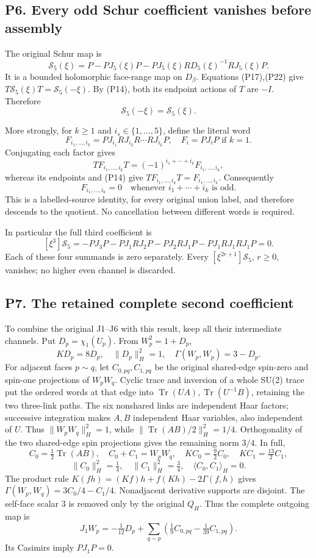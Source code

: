 \documentclass[11pt]{article}
\begin{document}
\subsection*{P6. Every odd Schur coefficient vanishes before assembly}

The original Schur map is
\[
 \mathscr S_5(\xi)=P-PJ_5(\xi)P
 -PJ_5(\xi)R D_5(\xi)^{-1}RJ_5(\xi)P. \tag{P23}
\]
It is a bounded holomorphic face-range map on \(D_\beta\). Equations (P17),(P22) give \(T\mathscr S_5(\xi)T=\mathscr S_5(-\xi)\). By (P14), both its endpoint actions of \(T\) are \(-I\). Therefore
\[
 \boxed{\mathscr S_5(-\xi)=\mathscr S_5(\xi).} \tag{P24}
\]

More strongly, for \(k\ge1\) and \(i_s\in\{1,\ldots,5\}\), define the literal word
\[
 F_{i_1,\ldots,i_k}=PJ_{i_1}RJ_{i_2}R\cdots RJ_{i_k}P,
 \quad F_i=PJ_iP\text{ if }k=1.
\]
Conjugating each factor gives
\[
 TF_{i_1,\ldots,i_k}T=(-1)^{i_1+\cdots+i_k}F_{i_1,\ldots,i_k},
\]
whereas its endpoints and (P14) give \(TF_{i_1,\ldots,i_k}T=F_{i_1,\ldots,i_k}\). Consequently
\[
 \boxed{F_{i_1,\ldots,i_k}=0
 \quad\text{whenever }i_1+\cdots+i_k\text{ is odd}.} \tag{P25}
\]
This is a labelled-source identity, for every original union label, and therefore descends to the quotient. No cancellation between different words is required.

In particular the full third coefficient is
\[
 [\xi^3]\mathscr S_5
 =-PJ_3P-PJ_1RJ_2P-PJ_2RJ_1P-PJ_1RJ_1RJ_1P=0. \tag{P26}
\]
Each of these four summands is zero separately. Every \([\xi^{2r+1}]\mathscr S_5\), \(r\ge0\), vanishes; no higher even channel is discarded.

\subsection*{P7. The retained complete second coefficient}

To combine the original J1–J6 with this result, keep all their intermediate channels. Put \(D_p=\chi_1(U_p)\). From \(W_p^2=1+D_p\),
\[
 KD_p=8D_p,\quad\|D_p\|_H^2=1,\quad
 \Gamma(W_p,W_p)=3-D_p.
\]
For adjacent faces \(p\sim q\), let \(C_{0,pq},C_{1,pq}\) be the original shared-edge spin-zero and spin-one projections of \(W_pW_q\). Cyclic trace and inversion of a whole SU(2) trace put the ordered words at that edge into \(\operatorname{Tr}(UA),\operatorname{Tr}(U^{-1}B)\), retaining the two three-link paths. The six nonshared links are independent Haar factors; successive integration makes \(A,B\) independent Haar variables, also independent of \(U\). Thus \(\|W_pW_q\|_H^2=1\), while \(\|\operatorname{Tr}(AB)/2\|_H^2=1/4\). Orthogonality of the two shared-edge spin projections gives the remaining norm \(3/4\). In full,
\[
 C_0=\tfrac12\operatorname{Tr}(AB),\quad C_0+C_1=W_pW_q,\quad
 KC_0=\tfrac92C_0,\quad KC_1=\tfrac{13}2C_1,
\]
\[
 \|C_0\|_H^2=\tfrac14,\quad\|C_1\|_H^2=\tfrac34,\quad
 \langle C_0,C_1\rangle_H=0.
\]
The product rule \(K(fh)=(Kf)h+f(Kh)-2\Gamma(f,h)\) gives
\(\Gamma(W_p,W_q)=3C_0/4-C_1/4\). Nonadjacent derivative supports are disjoint. The self-face scalar 3 is removed only by the original \(Q_H\). Thus the complete outgoing map is
\[
 J_1W_p=-\tfrac1{12}D_p+
 \sum_{q\sim p}\left(\tfrac19C_{0,pq}-\tfrac1{39}C_{1,pq}\right).
 \tag{P27}
\]
Its Casimirs imply \(PJ_1P=0\).
\end{document}
